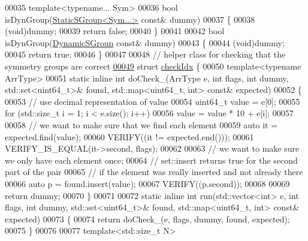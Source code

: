 \begin{DoxyCode}
00035 \textcolor{keyword}{template}<\textcolor{keyword}{typename}... Sym>
00036 \textcolor{keywordtype}{bool} isDynGroup(\hyperlink{class_eigen_1_1_static_s_group}{StaticSGroup<Sym...>} \textcolor{keyword}{const}& dummy)
00037 \{
00038   (void)dummy;
00039   \textcolor{keywordflow}{return} \textcolor{keyword}{false};
00040 \}
00041 
00042 \textcolor{keywordtype}{bool} isDynGroup(\hyperlink{class_eigen_1_1_dynamic_s_group}{DynamicSGroup} \textcolor{keyword}{const}& dummy)
00043 \{
00044   (void)dummy;
00045   \textcolor{keywordflow}{return} \textcolor{keyword}{true};
00046 \}
00047 
00048 \textcolor{comment}{// helper class for checking that the symmetry groups are correct}
\hyperlink{structcheck_idx}{00049} \textcolor{keyword}{struct }\hyperlink{structcheck_idx}{checkIdx} \{
00050   \textcolor{keyword}{template}<\textcolor{keyword}{typename} ArrType>
00051   \textcolor{keyword}{static} \textcolor{keyword}{inline} \textcolor{keywordtype}{int} doCheck\_(ArrType e, \textcolor{keywordtype}{int} flags, \textcolor{keywordtype}{int} dummy, std::set<uint64\_t>& found, std::map<uint64\_t,
       int> \textcolor{keyword}{const}& expected)
00052   \{
00053     \textcolor{comment}{// use decimal representation of value}
00054     uint64\_t value = e[0];
00055     \textcolor{keywordflow}{for} (std::size\_t i = 1; i < e.size(); i++)
00056       value = value * 10 + e[i];
00057 
00058     \textcolor{comment}{// we want to make sure that we find each element}
00059     \textcolor{keyword}{auto} it = expected.find(value);
00060     VERIFY((it != expected.end()));
00061     VERIFY\_IS\_EQUAL(it->second, flags);
00062 
00063     \textcolor{comment}{// we want to make sure we only have each element once;}
00064     \textcolor{comment}{// set::insert returns true for the second part of the pair}
00065     \textcolor{comment}{// if the element was really inserted and not already there}
00066     \textcolor{keyword}{auto} p = found.insert(value);
00067     VERIFY((p.second));
00068 
00069     \textcolor{keywordflow}{return} dummy;
00070   \}
00071 
00072   \textcolor{keyword}{static} \textcolor{keyword}{inline} \textcolor{keywordtype}{int} run(std::vector<int> e, \textcolor{keywordtype}{int} flags, \textcolor{keywordtype}{int} dummy, std::set<uint64\_t>& found, 
      std::map<uint64\_t, int> \textcolor{keyword}{const}& expected)
00073   \{
00074     \textcolor{keywordflow}{return} doCheck\_(e, flags, dummy, found, expected);
00075   \}
00076 
00077   \textcolor{keyword}{template}<std::\textcolor{keywordtype}{size\_t} N>

\end{DoxyCode}
